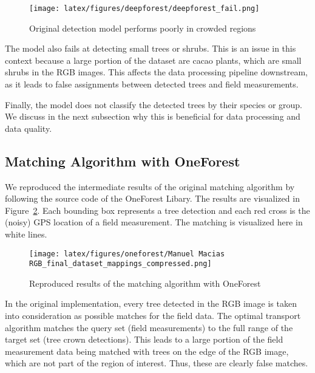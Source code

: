 \documentclass[10pt,twocolumn,letterpaper]{article}
\begin{document}
\begin{figure}
\centering
\texttt{[image: latex/figures/deepforest/deepforest\_fail.png]}  
\caption{Original detection model performs poorly in crowded regions}
\label{deepforest-fail}
\end{figure}

The model also fails at detecting small trees or shrubs.
This is an issue in this context because a large portion of the dataset are cacao plants, which are small shrubs in the RGB images.
This affects the data processing pipeline downstream, as it leads to false assignments between detected trees and field measurements.

Finally, the model does not classify the detected trees by their species or group.
We discuss in the next subsection why this is beneficial for data processing and data quality.

\subsection{Matching Algorithm with OneForest}
We reproduced the intermediate results of the original matching algorithm by following the source code of the OneForest Libary.
The results are visualized in Figure~\ref{oneforest-original}.
Each bounding box represents a tree detection and each red cross is the (noisy) GPS location of a field measurement.
The matching is visualized here in white lines.

\begin{figure}
\centering
\texttt{[image: latex/figures/oneforest/Manuel Macias RGB\_final\_dataset\_mappings\_compressed.png]}  
\caption{Reproduced results of the matching algorithm with OneForest}
\label{oneforest-original}
\end{figure}

In the original implementation, every tree detected in the RGB image is taken into consideration as possible matches for the field data.
The optimal transport algorithm matches the query set (field measurements) to the full range of the target set (tree crown detections).
This leads to a large portion of the field measurement data being matched with trees on the edge of the RGB image, which are not part of the region of interest.
Thus, these are clearly false matches.
\end{document}
